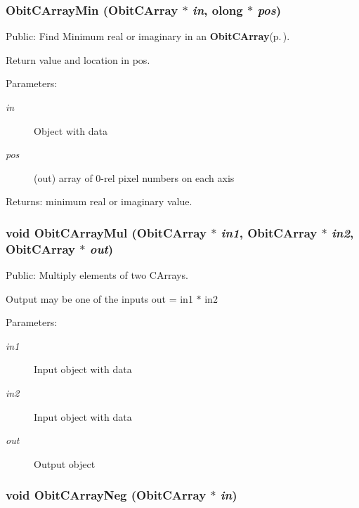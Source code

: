 \subsubsection{ Obit\-CArray\-Min ({\bf Obit\-CArray} $\ast$ {\em in}, {\bf olong} $\ast$ {\em pos})}\label{ObitCArray_8h_a44}


Public: Find Minimum real or imaginary in an {\bf Obit\-CArray}{\rm (p.\,\pageref{structObitCArray})}. 

Return value and location in pos. \begin{Desc}
\item[Parameters:]
\begin{description}
\item[{\em in}]Object with data \item[{\em pos}](out) array of 0-rel pixel numbers on each axis \end{description}
\end{Desc}
\begin{Desc}
\item[Returns:]minimum real or imaginary value. \end{Desc}
\subsubsection{\setlength{\rightskip}{0pt plus 5cm}void Obit\-CArray\-Mul ({\bf Obit\-CArray} $\ast$ {\em in1}, {\bf Obit\-CArray} $\ast$ {\em in2}, {\bf Obit\-CArray} $\ast$ {\em out})}\label{ObitCArray_8h_a54}


Public: Multiply elements of two CArrays. 

Output may be one of the inputs out = in1 $\ast$ in2 \begin{Desc}
\item[Parameters:]
\begin{description}
\item[{\em in1}]Input object with data \item[{\em in2}]Input object with data \item[{\em out}]Output object \end{description}
\end{Desc}
\subsubsection{\setlength{\rightskip}{0pt plus 5cm}void Obit\-CArray\-Neg ({\bf Obit\-CArray} $\ast$ {\em in})}\label{ObitCArray_8h_a45}


